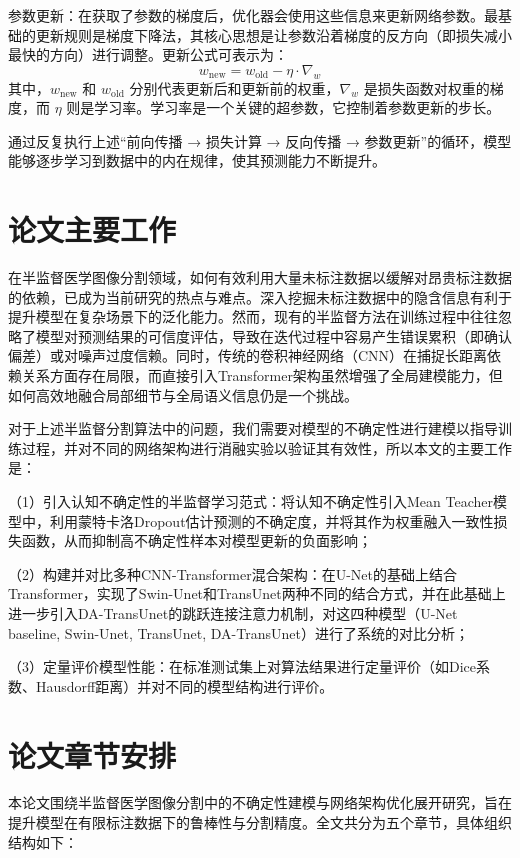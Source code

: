 \documentclass{xduugthesis}
\begin{document}
参数更新：在获取了参数的梯度后，优化器会使用这些信息来更新网络参数。最基础的更新规则是梯度下降法，其核心思想是让参数沿着梯度的反方向（即损失减小最快的方向）进行调整。更新公式可表示为：
\begin{equation}
    w_{\text{new}} = w_{\text{old}} - \eta \cdot \nabla_w
\end{equation}
​
其中，$w_{\text{new}}$ 和 $w_{\text{old}}$ 分别代表更新后和更新前的权重，$\nabla_w$ 是损失函数对权重的梯度，而 $\eta$ 则是学习率。学习率是一个关键的超参数，它控制着参数更新的步长。

通过反复执行上述“前向传播 → 损失计算 → 反向传播 → 参数更新”的循环，模型能够逐步学习到数据中的内在规律，使其预测能力不断提升。

\section{论文主要工作}
在半监督医学图像分割领域，如何有效利用大量未标注数据以缓解对昂贵标注数据的依赖，已成为当前研究的热点与难点。深入挖掘未标注数据中的隐含信息有利于提升模型在复杂场景下的泛化能力。然而，现有的半监督方法在训练过程中往往忽略了模型对预测结果的可信度评估，导致在迭代过程中容易产生错误累积（即确认偏差）或对噪声过度信赖。同时，传统的卷积神经网络（CNN）在捕捉长距离依赖关系方面存在局限，而直接引入Transformer架构虽然增强了全局建模能力，但如何高效地融合局部细节与全局语义信息仍是一个挑战。

对于上述半监督分割算法中的问题，我们需要对模型的不确定性进行建模以指导训练过程，并对不同的网络架构进行消融实验以验证其有效性，所以本文的主要工作是： 

（1）引入认知不确定性的半监督学习范式：将认知不确定性引入Mean Teacher模型中，利用蒙特卡洛Dropout估计预测的不确定度，并将其作为权重融入一致性损失函数，从而抑制高不确定性样本对模型更新的负面影响；

（2）构建并对比多种CNN-Transformer混合架构：在U-Net的基础上结合Transformer，实现了Swin-Unet和TransUnet两种不同的结合方式，并在此基础上进一步引入DA-TransUnet的跳跃连接注意力机制，对这四种模型（U-Net baseline, Swin-Unet, TransUnet, DA-TransUnet）进行了系统的对比分析；

（3）定量评价模型性能：在标准测试集上对算法结果进行定量评价（如Dice系数、Hausdorff距离）并对不同的模型结构进行评价。

\section{论文章节安排}
本论文围绕半监督医学图像分割中的不确定性建模与网络架构优化展开研究，旨在提升模型在有限标注数据下的鲁棒性与分割精度。全文共分为五个章节，具体组织结构如下：
\end{document}
